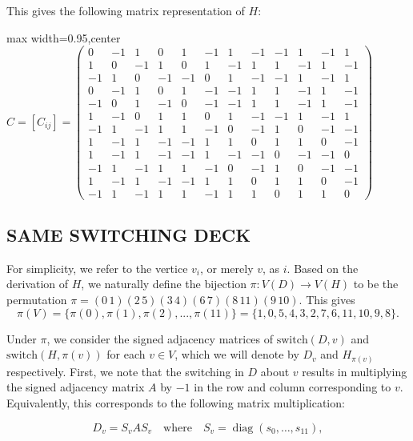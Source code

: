 \documentclass[11pt]{article}
\theoremstyle{definition}
\numberwithin{equation}{section}
\begin{document}
\begin{humanaiblock}
This gives the following matrix representation of $H$: 

\begin{center}
\setlength{\arraycolsep}{2.5pt}
\renewcommand{\arraystretch}{0.9}
\setcounter{MaxMatrixCols}{20}
\begin{adjustbox}{max width=0.95\textwidth,center}
$\displaystyle
C=[C_{ij}]=
\begin{pmatrix}
 0&-1& 1& 0& 1&-1& 1&-1&-1& 1&-1& 1\\
 1& 0&-1& 1& 0& 1&-1& 1& 1&-1& 1&-1\\
-1& 1& 0&-1&-1& 0& 1&-1&-1& 1&-1& 1\\
 0&-1& 1& 0& 1&-1&-1& 1& 1&-1& 1&-1\\
-1& 0& 1&-1& 0&-1&-1& 1& 1&-1& 1&-1\\
 1&-1& 0& 1& 1& 0& 1&-1&-1& 1&-1& 1\\
-1& 1&-1& 1& 1&-1& 0&-1& 1& 0&-1&-1\\
 1&-1& 1&-1&-1& 1& 1& 0& 1& 1& 0&-1\\
 1&-1& 1&-1&-1& 1&-1&-1& 0&-1&-1& 0\\
-1& 1&-1& 1& 1&-1& 0&-1& 1& 0&-1&-1\\
 1&-1& 1&-1&-1& 1& 1& 0& 1& 1& 0&-1\\
-1& 1&-1& 1& 1&-1& 1& 1& 0& 1& 1& 0
\end{pmatrix}
$
\end{adjustbox}
\end{center}
\subsection*{SAME SWITCHING DECK}
For simplicity, we refer to the vertice $v_i$, or merely $v$, as $i$. Based on the derivation of $H$, we naturally define the bijection $\pi: V(D) \to V(H)$ to be the permutation 
 $\pi = (0\,1)(2\,5)(3\,4)(6\,7)(8\,11)(9\,10)$. This gives  
\[
\pi(V) = \{\pi(0), \pi(1), \pi(2), ... , \pi(11) \} = \{1,0,5,4,3,2,7,6,11,10,9,8\}.
\]

Under $\pi$, we consider the signed adjacency matrices of $\mathrm{switch}(D,v)$ and $\mathrm{switch}(H,\pi(v))$ for each $v \in V$, which we will denote by $D_v$ and $H_{\pi(v)}$ respectively. First, we note that the switching in $D$ about $v$ results in multiplying the signed adjacency matrix $A$ by $-1$ in the row and column corresponding to $v$. Equivalently, this corresponds to the following matrix multiplication: 

\[ D_v = S_vAS_v \quad  \text{where} \quad S_v = \operatorname{diag}(s_0,\dots,s_{11}),\]


\end{humanaiblock}
\end{document}
